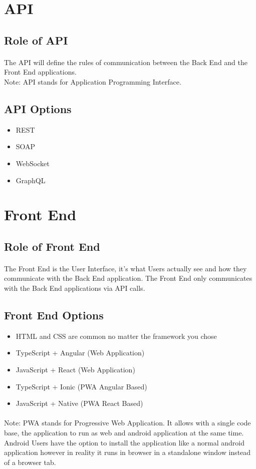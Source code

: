 \documentclass{article}
\begin{document}
\section{API}
\subsection{Role of API}
\paragraph{} The API will define the rules of communication between the Back End and the Front End applications.\\Note: API stands for Application Programming Interface.
\subsection{API Options}
\begin{itemize}
	\item REST
	\item SOAP
	\item WebSocket
	\item GraphQL
\end{itemize}


\section{Front End}
\subsection{Role of Front End}
\paragraph{} The Front End is the User Interface, it's what Users actually see and how they communicate with the Back End application. The Front End only communicates with the Back End applications via API calls.
\subsection{Front End Options}
\begin{itemize}
	\item HTML and CSS are common no matter the framework you chose
	\item TypeScript + Angular (Web Application)
	\item JavaScript + React (Web Application)
	\item TypeScript + Ionic (PWA Angular Based)
	\item JavaScript + Native (PWA React Based)
\end{itemize}
\paragraph{} Note: PWA stands for Progressive Web Application. It allows with a single code base, the application to run as web and android application at the same time. Android Users have the option to install the application like a normal android application however in reality it runs in browser in a standalone window instead of a browser tab.
\end{document}
